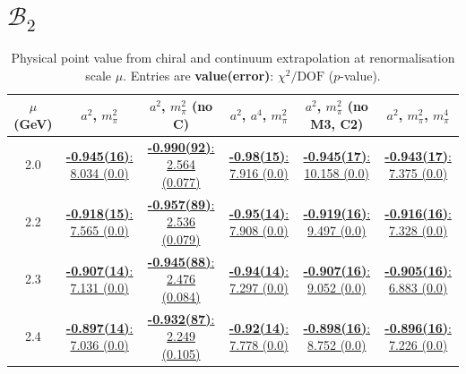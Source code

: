 \documentclass[12pt]{extarticle}
\begin{document}
\section{$\mathcal{B}_2$}
\begin{table}[h!]
\begin{center}
\begin{tabular}{|c|c|c|c|c|c|}
\hline
$\mu$ (GeV) & $a^2$, $m_\pi^2$& $a^2$, $m_\pi^2$ (no C)& $a^2$, $a^4$, $m_\pi^2$& $a^2$, $m_\pi^2$ (no M3, C2)& $a^2$, $m_\pi^2$, $m_\pi^4$\\
\hline
2.0& \hyperlink{VVmAA/SUSY/a2m2_20.pdf.1}{\textbf{-0.945(16)}: 8.034 (0.0)} & \hyperlink{VVmAA/SUSY/a2m2noC_20.pdf.1}{\textbf{-0.990(92)}: 2.564 (0.077)} & \hyperlink{VVmAA/SUSY/a2a4m2_20.pdf.1}{\textbf{-0.98(15)}: 7.916 (0.0)} & \hyperlink{VVmAA/SUSY/a2m2mcut_20.pdf.1}{\textbf{-0.945(17)}: 10.158 (0.0)} & \hyperlink{VVmAA/SUSY/a2m2m4_20.pdf.1}{\textbf{-0.943(17)}: 7.375 (0.0)}\\
2.2& \hyperlink{VVmAA/SUSY/a2m2_22.pdf.1}{\textbf{-0.918(15)}: 7.565 (0.0)} & \hyperlink{VVmAA/SUSY/a2m2noC_22.pdf.1}{\textbf{-0.957(89)}: 2.536 (0.079)} & \hyperlink{VVmAA/SUSY/a2a4m2_22.pdf.1}{\textbf{-0.95(14)}: 7.908 (0.0)} & \hyperlink{VVmAA/SUSY/a2m2mcut_22.pdf.1}{\textbf{-0.919(16)}: 9.497 (0.0)} & \hyperlink{VVmAA/SUSY/a2m2m4_22.pdf.1}{\textbf{-0.916(16)}: 7.328 (0.0)}\\
2.3& \hyperlink{VVmAA/SUSY/a2m2_23.pdf.1}{\textbf{-0.907(14)}: 7.131 (0.0)} & \hyperlink{VVmAA/SUSY/a2m2noC_23.pdf.1}{\textbf{-0.945(88)}: 2.476 (0.084)} & \hyperlink{VVmAA/SUSY/a2a4m2_23.pdf.1}{\textbf{-0.94(14)}: 7.297 (0.0)} & \hyperlink{VVmAA/SUSY/a2m2mcut_23.pdf.1}{\textbf{-0.907(16)}: 9.052 (0.0)} & \hyperlink{VVmAA/SUSY/a2m2m4_23.pdf.1}{\textbf{-0.905(16)}: 6.883 (0.0)}\\
2.4& \hyperlink{VVmAA/SUSY/a2m2_24.pdf.1}{\textbf{-0.897(14)}: 7.036 (0.0)} & \hyperlink{VVmAA/SUSY/a2m2noC_24.pdf.1}{\textbf{-0.932(87)}: 2.249 (0.105)} & \hyperlink{VVmAA/SUSY/a2a4m2_24.pdf.1}{\textbf{-0.92(14)}: 7.778 (0.0)} & \hyperlink{VVmAA/SUSY/a2m2mcut_24.pdf.1}{\textbf{-0.898(16)}: 8.752 (0.0)} & \hyperlink{VVmAA/SUSY/a2m2m4_24.pdf.1}{\textbf{-0.896(16)}: 7.226 (0.0)}\\
\hline
\end{tabular}
\caption{Physical point value from chiral and continuum extrapolation at renormalisation scale $\mu$. Entries are \textbf{value(error)}: $\chi^2/\text{DOF}$ ($p$-value).}
\end{center}
\end{table}
\end{document}
